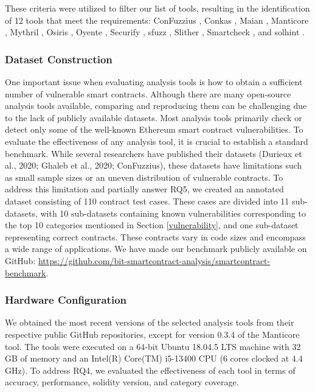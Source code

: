 \documentclass[manuscript,screen]{acmart}
\begin{document}
These criteria were utilized to filter our list of tools, resulting in the identification of 12 tools that meet the requirements: ConFuzzius \cite{ConFuzzius}, Conkas \cite{conkas}, Maian \cite{MAIAN}, Manticore \cite{manticore}, Mythril \cite{mythril}, Osiris \cite{Osiris}, Oyente \cite{oyente}, Securify \cite{securify2}, sfuzz \cite{sfuzz}, Slither \cite{slither}, Smartcheck \cite{smartcheck}, and solhint \cite{solhint}.

\subsubsection{Dataset Construction}
One important issue when evaluating analysis tools is how to obtain a sufficient number of vulnerable smart contracts. Although there are many open-source analysis tools available, comparing and reproducing them can be challenging due to the lack of publicly available datasets. Most analysis tools primarily check or detect only some of the well-known Ethereum smart contract vulnerabilities. To evaluate the effectiveness of any analysis tool, it is crucial to establish a standard benchmark. While several researchers have published their datasets (Durieux et al., 2020; Ghaleb et al., 2020; ConFuzzius), these datasets have limitations such as small sample sizes or an uneven distribution of vulnerable contracts. 
To address this limitation and partially answer RQ5, we created an annotated dataset consisting of 110 contract test cases. These cases are divided into 11 sub-datasets, with 10 sub-datasets containing known vulnerabilities corresponding to the top 10 categories mentioned in Section \ref{vulnerability}, and one sub-dataset representing correct contracts. These contracts vary in code sizes and encompass a wide range of applications. We have made our benchmark publicly available on GitHub: \url{https://github.com/bit-smartcontract-analysis/smartcontract-benchmark}.

\subsubsection{Hardware Configuration}
We obtained the most recent versions of the selected analysis tools from their respective public GitHub repositories, except for version 0.3.4 of the Manticore tool. The tools were executed on a 64-bit Ubuntu 18.04.5 LTS machine with 32 GB of memory and an Intel(R) Core(TM) i5-13400 CPU (6 cores clocked at 4.4 GHz). To address RQ4, we evaluated the effectiveness of each tool in terms of accuracy, performance, solidity version, and category coverage.
\end{document}
